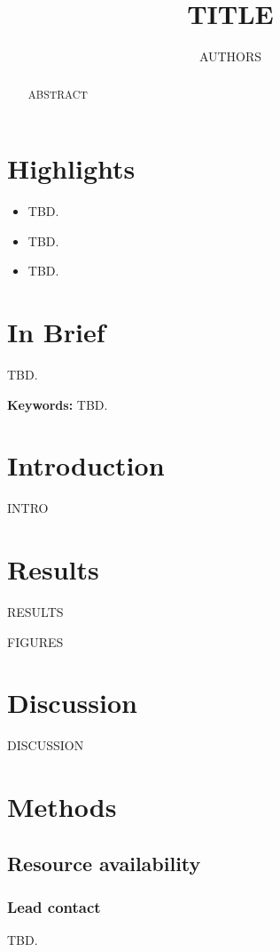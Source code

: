 \documentclass[11pt]{article}
\title{{{TITLE}}}
\author{{{AUTHORS}}}
\begin{document}
\maketitle

\section*{Highlights}
\begin{itemize}
\item TBD.
\item TBD.
\item TBD.
\end{itemize}

\section*{In Brief}
TBD.

\begin{abstract}
{ABSTRACT}
\end{abstract}

\textbf{Keywords:} TBD.

\section{Introduction}
{INTRO}

\section{Results}
{RESULTS}

{FIGURES}

\section{Discussion}
{DISCUSSION}

\section{Methods}
\subsection{Resource availability}
\subsubsection{Lead contact}
TBD.
\end{document}
